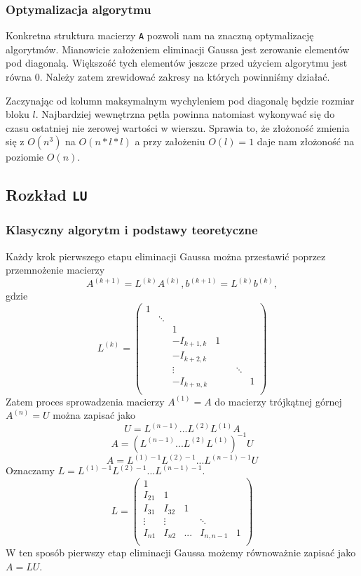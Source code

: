 \documentclass{article}
\begin{document}
\begin{itemize}
\subsubsection*{Optymalizacja algorytmu}
Konkretna struktura macierzy \texttt{A} pozwoli  nam na znaczną optymalizację algorytmów. Mianowicie założeniem eliminacji Gaussa jest zerowanie elementów pod diagonalą. Większość tych elementów jeszcze przed użyciem algorytmu jest równa 0. Należy zatem zrewidować zakresy na których powinniśmy działać.

Zaczynając od kolumn maksymalnym wychyleniem pod diagonalę będzie rozmiar bloku $l$. Najbardziej wewnętrzna pętla powinna natomiast wykonywać się do czasu ostatniej nie zerowej wartości w wierszu. Sprawia to, że złożoność zmienia się z $O(n^3)$ na $O(n*l*l)$ a przy założeniu $O(l)=1$ daje nam złożoność na poziomie $O(n)$. 
\subsection*{Rozkład \texttt{LU}}

\subsubsection*{Klasyczny algorytm i podstawy teoretyczne}
Każdy krok pierwszego etapu eliminacji Gaussa można przestawić poprzez przemnożenie macierzy
\[ A^{(k+1)} = L^{(k)}A^{(k)}, b^{(k+1)} = L^{(k)}b^{(k)}, \]
gdzie
\[
    L^{(k)}=
    \begin{pmatrix}
        1 &        &            &   &  &        &   \\
          & \ddots &            &   &  &        &   \\
          &        & 1          &   &  &        &   \\
          &        & -I_{k+1,k} & 1 &  &        &   \\
          &        & -I_{k+2,k} &   &  &        &   \\
          &        & \vdots     &   &  & \ddots &   \\
          &        & -I_{k+n,k} &   &  &        & 1 \\
    \end{pmatrix}
\]
Zatem proces sprowadzenia macierzy $A^{(1)} = A$ do macierzy trójkątnej górnej $A^{(n)} = U$ można zapisać jako
\[ U = L^{(n-1)}...L^{(2)}L^{(1)}A \]
\[ A = (L^{(n-1)}...L^{(2)}L^{(1)})^{-1}U \]
\[ A = L^{(1)-1}L^{(2)-1}...L^{(n-1)-1}U \]
Oznaczamy $L = L^{(1)-1}L^{(2)-1}...L^{(n-1)-1}$.
\[
    L=
    \begin{pmatrix}
        1      &        &     &           &   \\
        I_{21} & 1      &     &           &   \\
        I_{31} & I_{32} & 1   &           &   \\
        \vdots & \vdots &     & \ddots    &   \\
        I_{n1} & I_{n2} & ... & I_{n,n-1} & 1 \\
    \end{pmatrix}
\]
W ten sposób pierwszy etap eliminacji Gaussa możemy równoważnie zapisać jako $A = LU$.


\end{itemize}
\end{document}
